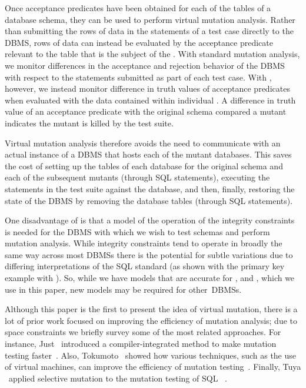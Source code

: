 
 Once acceptance predicates have been obtained for each of the tables of a database schema, they can be used to perform virtual mutation analysis. Rather than submitting the rows of data in the \INSERT statements of a test case directly to the DBMS, rows of data can instead be evaluated by the acceptance predicate relevant to the table that is the subject of the \INSERT. With standard mutation analysis, we monitor differences in the acceptance and rejection behavior of the DBMS with respect to the \INSERT statements submitted as part of each test case. With \vma, however, we instead monitor difference in truth values of acceptance predicates when evaluated with the data contained within individual \INSERT. A difference in truth value of an acceptance predicate with the original schema compared a mutant indicates the mutant is killed by the test suite.


Virtual mutation analysis therefore avoids the need to communicate with an actual instance of a DBMS that hosts each of the mutant databases. This saves the cost of setting up the tables of each database for the original schema and each of the subsequent mutants (through SQL   statements), executing the \INSERT statements in the test suite against the database, and then, finally, restoring the state of the DBMS by removing the database tables (through SQL   statements).

One disadvantage of \vma is that a model of the operation of the integrity constraints is needed for the DBMS with which we wish to test schemas and perform mutation analysis. While integrity constraints tend to operate in broadly the same way across most DBMSs there is the potential for subtle variations due to differing interpretations of the SQL standard (as shown with the primary key example with \SQLite). So, while we have models that are accurate for \HyperSQL, \Postgres and \SQLite, which we use in this paper, new models may be required for \mbox{other DBMSs}.

 Although this paper is the first to present the idea of virtual mutation, there is a lot of prior work focused on improving the efficiency of mutation analysis; due to space constraints we briefly survey some of the most related approaches. For instance, Just \etal~introduced a compiler-integrated method to make mutation testing faster~\cite{Just2011}. Also, Tokumoto \etal~showed how various techniques, such as the use of virtual machines, can improve the efficiency of mutation testing~\cite{Tokumoto2016}. Finally, Tuya \etal~applied selective mutation to the mutation testing of SQL \SELECTs~\cite{Tuya2007}.


